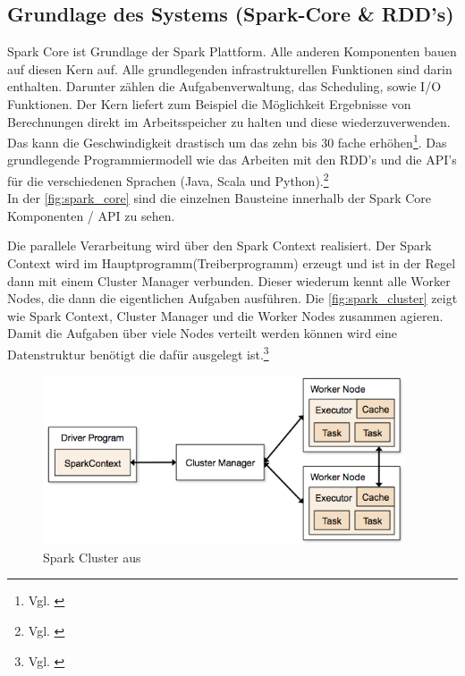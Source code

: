 \subsection{Grundlage des Systems (Spark-Core \& RDD’s)}\label{sec_sparkcore}
Spark Core ist Grundlage der Spark Plattform. Alle anderen Komponenten bauen auf diesen Kern auf. Alle grundlegenden infrastrukturellen Funktionen sind darin enthalten. Darunter zählen die Aufgabenverwaltung, das Scheduling, sowie I/O Funktionen.
Der Kern liefert zum Beispiel die Möglichkeit Ergebnisse von Berechnungen direkt im Arbeitsspeicher zu halten und diese wiederzuverwenden. Das kann die Geschwindigkeit drastisch um das zehn bis 30 fache erhöhen\footnote{Vgl. \cite{VYL+16}}. 
Das grundlegende Programmiermodell wie das Arbeiten mit den RDD's und die API's für die verschiedenen Sprachen (Java, Scala und Python).\footnote{Vgl. \cite{DATABRICK_ABOUT}} \\
In der \autoref{fig:spark_core} sind die einzelnen Bausteine innerhalb der Spark Core Komponenten / API zu sehen. 
 


\noindent
Die parallele Verarbeitung wird über den Spark Context realisiert. Der Spark Context wird im Hauptprogramm(Treiberprogramm) erzeugt und ist in der Regel dann mit einem Cluster Manager verbunden. Dieser wiederum kennt alle Worker Nodes, die dann die eigentlichen Aufgaben ausführen. Die \autoref{fig:spark_cluster} zeigt wie Spark Context, Cluster Manager und die Worker Nodes zusammen agieren. Damit die Aufgaben über viele Nodes verteilt werden können wird eine Datenstruktur benötigt die dafür ausgelegt ist.\footnote{Vgl. \cite[101]{BDS16}}

\begin{figure}[h]
  \centering
  \includegraphics[width=\textwidth,height=50mm]{./bilder/cluster-overview.png}
  \caption{Spark Cluster aus \cite{SPCLUSTER}}\label{fig:spark_cluster}
\end{figure}



